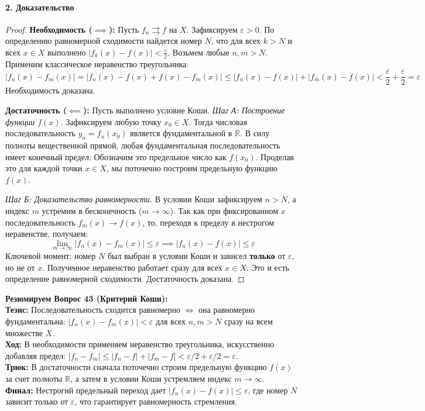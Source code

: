 \paragraph{2. Доказательство}
\begin{proof}
\textbf{Необходимость ($\implies$):} 
Пусть $f_n \rightrightarrows f$ на $X$. Зафиксируем $\varepsilon > 0$. По определению равномерной сходимости найдется номер $N$, что для всех $k > N$ и всех $x \in X$ выполнено $|f_k(x) - f(x)| < \frac{\varepsilon}{2}$. 
Возьмем любые $n, m > N$. Применим классическое неравенство треугольника:
$$ |f_n(x) - f_m(x)| = |f_n(x) - f(x) + f(x) - f_m(x)| \le |f_n(x) - f(x)| + |f_m(x) - f(x)| < \frac{\varepsilon}{2} + \frac{\varepsilon}{2} = \varepsilon $$
Необходимость доказана.

\textbf{Достаточность ($\impliedby$):}
Пусть выполнено условие Коши.
\textit{Шаг А: Построение функции $f(x)$.} Зафиксируем любую точку $x_0 \in X$. Тогда числовая последовательность $y_n = f_n(x_0)$ является фундаментальной в $\mathbb{R}$. В силу полноты вещественной прямой, любая фундаментальная последовательность имеет конечный предел. Обозначим это предельное число как $f(x_0)$. Проделав это для каждой точки $x \in X$, мы поточечно построим предельную функцию $f(x)$.

\textit{Шаг Б: Доказательство равномерности.} В условии Коши зафиксируем $n > N$, а индекс $m$ устремим в бесконечность ($m \to \infty$).
Так как при фиксированном $x$ последовательность $f_m(x) \to f(x)$, то, переходя к пределу в нестрогом неравенстве, получаем:
$$ \lim_{m \to \infty} |f_n(x) - f_m(x)| \le \varepsilon \implies |f_n(x) - f(x)| \le \varepsilon $$
Ключевой момент: номер $N$ был выбран в условии Коши и зависел \textbf{только} от $\varepsilon$, но не от $x$. Полученное неравенство работает сразу для всех $x \in X$. Это и есть определение равномерной сходимости. Достаточность доказана.
\end{proof}

\begin{tcolorbox}[colback=gray!5, colframe=black, boxrule=0.5pt, arc=0pt]
\textbf{Резюмируем Вопрос 43 (Критерий Коши):} \\
\textbf{Тезис:} Последовательность сходится равномерно $\iff$ она равномерно фундаментальна: $|f_n(x) - f_m(x)| < \varepsilon$ для всех $n,m > N$ сразу на всем множестве $X$. \\
\textbf{Ход:} В необходимости применяем неравенство треугольника, искусственно добавляя предел: $|f_n - f_m| \le |f_n - f| + |f_m - f| < \varepsilon/2 + \varepsilon/2 = \varepsilon$. \\
\textbf{Трюк:} В достаточности сначала поточечно строим предельную функцию $f(x)$ за счет полноты $\mathbb{R}$, а затем в условии Коши устремляем индекс $m \to \infty$. \\
\textbf{Финал:} Нестрогий предельный переход дает $|f_n(x) - f(x)| \le \varepsilon$, где номер $N$ зависит только от $\varepsilon$, что гарантирует равномерность стремления.
\end{tcolorbox}




